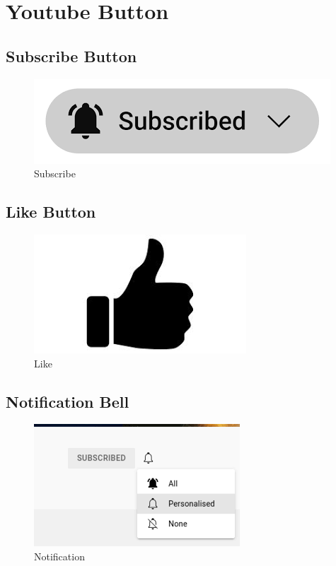 \chapter{Youtube Button}


\section{Subscribe Button}
\begin{figure}[h]
    \centering
    \includegraphics{images/subscribe.png}
    \caption{Subscribe}
    \label{fig: Subscribe}
\end{figure}

\section{Like Button}
\begin{figure}[h]
    \centering
    \includegraphics{images/like}
    \caption{Like}
    \label{fig: Like}
\end{figure}

\section{Notification Bell}
\begin{figure}[h]
    \centering
    \includegraphics{images/notification.png}
    \caption{Notification}
    \label{fig: Notification}
\end{figure}
